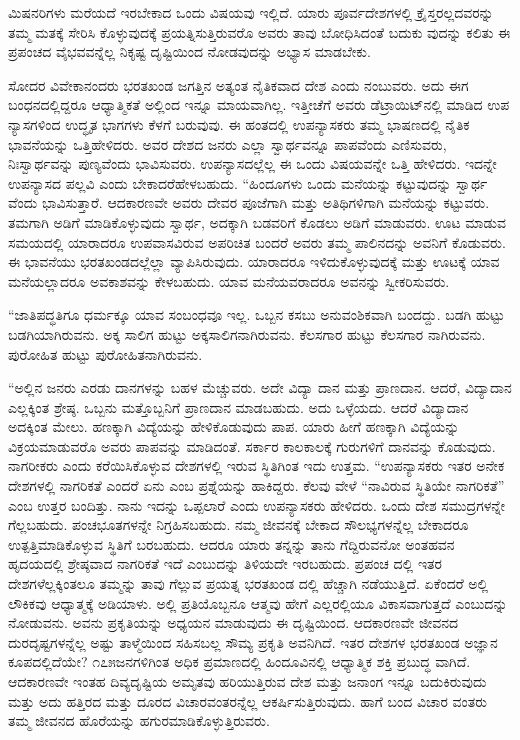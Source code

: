 ಮಿಷನರಿಗಳು ಮರೆಯದೆ ಇರಬೇಕಾದ ಒಂದು ವಿಷಯವು ಇಲ್ಲಿದೆ. ಯಾರು ಪೂರ್ವದೇಶಗಳಲ್ಲಿ ಕ್ರೈಸ್ತರಲ್ಲದವರನ್ನು ತಮ್ಮ ಮತಕ್ಕೆ ಸೇರಿಸಿ ಕೊಳ್ಳುವುದಕ್ಕೆ ಪ್ರಯತ್ನಿಸುತ್ತಿರುವರೊ ಅವರು ತಾವು ಬೋಧಿಸಿದಂತೆ ಬದುಕು ವುದನ್ನು ಕಲಿತು ಈ ಪ್ರಪಂಚದ ವೈಭವವನ್ನೆಲ್ಲ ನಿಕೃಷ್ಟ ದೃಷ್ಟಿಯಿಂದ ನೋಡವುದನ್ನು ಅಭ್ಯಾಸ ಮಾಡಬೇಕು.

ಸೋದರ ವಿವೇಕಾನಂದರು ಭರತಖಂಡ ಜಗತ್ತಿನ ಅತ್ಯಂತ ನೈತಿಕವಾದ ದೇಶ ಎಂದು ನಂಬುವರು. ಅದು ಈಗ ಬಂಧನದಲ್ಲಿದ್ದರೂ ಆಧ್ಯಾತ್ಮಿಕತೆ ಅಲ್ಲಿಂದ ಇನ್ನೂ ಮಾಯವಾಗಿಲ್ಲ. ಇತ್ತೀಚೆಗೆ ಅವರು ಡೆಟ್ರಾಯಿಟ್​ನಲ್ಲಿ ಮಾಡಿದ ಉಪ ನ್ಯಾಸಗಳಿಂದ ಉದ್ಧೃತ ಭಾಗಗಳು ಕೆಳಗೆ ಬರುವುವು. ಈ ಹಂತದಲ್ಲಿ ಉಪನ್ಯಾಸಕರು ತಮ್ಮ ಭಾಷಣದಲ್ಲಿ ನೈತಿಕ ಭಾವನೆಯನ್ನು ಒತ್ತಿಹೇಳಿದರು. ಅವರ ದೇಶದ ಜನರು ಎಲ್ಲಾ ಸ್ವಾರ್ಥವನ್ನೂ ಪಾಪವೆಂದು ಎಣಿಸುವರು, ನಿಃಸ್ವಾರ್ಥವನ್ನು ಪುಣ್ಯವೆಂದು ಭಾವಿಸುವರು. ಉಪನ್ಯಾಸದಲ್ಲೆಲ್ಲ ಈ ಒಂದು ವಿಷಯವನ್ನೇ ಒತ್ತಿ ಹೇಳಿದರು. ಇದನ್ನೇ ಉಪನ್ಯಾಸದ ಪಲ್ಲವಿ ಎಂದು ಬೇಕಾದರೆಹೇಳಬಹುದು. “ಹಿಂದೂಗಳು ಒಂದು ಮನೆಯನ್ನು ಕಟ್ಟುವುದನ್ನು ಸ್ವಾರ್ಥ ವೆಂದು ಭಾವಿಸುತ್ತಾರೆ. ಆದಕಾರಣವೇ ಅವರು ದೇವರ ಪೂಜೆಗಾಗಿ ಮತ್ತು ಅತಿಥಿಗಳಿಗಾಗಿ ಮನೆಯನ್ನು ಕಟ್ಟುವರು. ತಮಗಾಗಿ ಅಡಿಗೆ ಮಾಡಿಕೊಳ್ಳುವುದು ಸ್ವಾರ್ಥ, ಅದಕ್ಕಾಗಿ ಬಡವರಿಗೆ ಕೊಡಲು ಅಡಿಗೆ ಮಾಡುವರು. ಊಟ ಮಾಡುವ ಸಮಯದಲ್ಲಿ ಯಾರಾದರೂ ಉಪವಾಸವಿರುವ ಅಪರಿಚಿತ ಬಂದರೆ ಅವರು ತಮ್ಮ ಪಾಲಿನದನ್ನು ಅವನಿಗೆ ಕೊಡುವರು. ಈ ಭಾವನೆಯು ಭರತಖಂಡದಲ್ಲೆಲ್ಲಾ ವ್ಯಾಪಿಸಿರುವುದು. ಯಾರಾದರೂ ಇಳಿದುಕೊಳ್ಳುವುದಕ್ಕೆ ಮತ್ತು ಊಟಕ್ಕೆ ಯಾವ ಮನೆಯಲ್ಲಾದರೂ ಅವಕಾಶವನ್ನು ಕೇಳಬಹುದು. ಯಾವ ಮನೆಯವರಾದರೂ ಅವನನ್ನು ಸ್ವೀಕರಿಸುವರು.

“ಜಾತಿಪದ್ಧತಿಗೂ ಧರ್ಮಕ್ಕೂ ಯಾವ ಸಂಬಂಧವೂ ಇಲ್ಲ. ಒಬ್ಬನ ಕಸಬು ಅನುವಂಶಿಕವಾಗಿ ಬಂದದ್ದು. ಬಡಗಿ ಹುಟ್ಟು ಬಡಗಿಯಾಗಿರುವನು. ಅಕ್ಕ ಸಾಲಿಗ ಹುಟ್ಟು ಅಕ್ಕಸಾಲಿಗನಾಗಿರುವನು. ಕೆಲಸಗಾರ ಹುಟ್ಟು ಕೆಲಸಗಾರ ನಾಗಿರುವನು. ಪುರೋಹಿತ ಹುಟ್ಟು ಪುರೋಹಿತನಾಗಿರುವನು.

“ಅಲ್ಲಿನ ಜನರು ಎರಡು ದಾನಗಳನ್ನು ಬಹಳ ಮೆಚ್ಚುವರು. ಅದೇ ವಿದ್ಯಾ ದಾನ ಮತ್ತು ಪ್ರಾಣದಾನ. ಆದರೆ, ವಿದ್ಯಾದಾನ ಎಲ್ಲಕ್ಕಿಂತ ಶ್ರೇಷ್ಠ. ಒಬ್ಬನು ಮತ್ತೊಬ್ಬನಿಗೆ ಪ್ರಾಣದಾನ ಮಾಡಬಹುದು. ಅದು ಒಳ್ಳೆಯದು. ಆದರೆ ವಿದ್ಯಾದಾನ ಅದಕ್ಕಿಂತ ಮೇಲು. ಹಣಕ್ಕಾಗಿ ವಿದ್ಯೆಯನ್ನು ಹೇಳಿಕೊಡುವುದು ಪಾಪ. ಯಾರು ಹೀಗೆ ಹಣಕ್ಕಾಗಿ ವಿದ್ಯೆಯನ್ನು ವಿಕ್ರಯಮಾಡುವರೊ ಅವರು ಪಾಪವನ್ನು ಮಾಡಿದಂತೆ. ಸರ್ಕಾರ ಕಾಲಕಾಲಕ್ಕೆ ಗುರುಗಳಿಗೆ ದಾನವನ್ನು ಕೊಡುವುದು. ನಾಗರೀಕರು ಎಂದು ಕರೆಯಿಸಿಕೊಳ್ಳುವ ದೇಶಗಳಲ್ಲಿ ಇರುವ ಸ್ಥಿತಿಗಿಂತ ಇದು ಉತ್ತಮ. “ಉಪನ್ಯಾಸಕರು ಇತರ ಅನೇಕ ದೇಶಗಳಲ್ಲಿ ನಾಗರಿಕತೆ ಎಂದರೆ ಏನು ಎಂಬ ಪ್ರಶ್ನೆಯನ್ನು ಹಾಕಿದ್ದರು. ಕೆಲವು ವೇಳೆ “ನಾವಿರುವ ಸ್ಥಿತಿಯೇ ನಾಗರಿಕತೆ” ಎಂಬ ಉತ್ತರ ಬಂದಿತ್ತು. ನಾನು ಇದನ್ನು ಒಪ್ಪಲಾರೆ ಎಂದು ಉಪನ್ಯಾಸಕರು ಹೇಳಿದರು. ಒಂದು ದೇಶ ಸಮುದ್ರಗಳನ್ನೇ ಗೆಲ್ಲಬಹುದು. ಪಂಚಭೂತಗಳನ್ನೇ ನಿಗ್ರಹಿಸಬಹುದು. ನಮ್ಮ ಜೀವನಕ್ಕೆ ಬೇಕಾದ ಸೌಲಭ್ಯಗಳನ್ನೆಲ್ಲ ಬೇಕಾದರೂ ಉತ್ಪತ್ತಿಮಾಡಿಕೊಳ್ಳುವ ಸ್ಥಿತಿಗೆ ಬರಬಹುದು. ಆದರೂ ಯಾರು ತನ್ನನ್ನು ತಾನು ಗೆದ್ದಿರುವನೋ ಅಂತಹವನ ಹೃದಯದಲ್ಲಿ ಶ್ರೇಷ್ಠವಾದ ನಾಗರಿಕತೆ ಇದೆ ಎಂಬುದನ್ನು ತಿಳಿಯದೇ ಇರಬಹುದು. ಪ್ರಪಂಚ ದಲ್ಲಿ ಇತರ ದೇಶಗಳೆಲ್ಲಕ್ಕಿಂತಲೂ ತಮ್ಮನ್ನು ತಾವು ಗೆಲ್ಲುವ ಪ್ರಯತ್ನ ಭರತಖಂಡ ದಲ್ಲಿ ಹೆಚ್ಚಾಗಿ ನಡೆಯುತ್ತಿದೆ. ಏಕೆಂದರೆ ಅಲ್ಲಿ ಲೌಕಿಕವು ಆಧ್ಯಾತ್ಮಕ್ಕೆ ಅಡಿಯಾಳು. ಅಲ್ಲಿ ಪ್ರತಿಯೊಬ್ಬನೂ ಆತ್ಮವು ಹೇಗೆ ಎಲ್ಲರಲ್ಲಿಯೂ ವಿಕಾಸವಾಗುತ್ತದೆ ಎಂಬುದನ್ನು ನೋಡುವನು. ಅವನು ಪ್ರಕೃತಿಯನ್ನು ಅಧ್ಯಯನ ಮಾಡುವುದು ಈ ದೃಷ್ಟಿಯಿಂದ. ಆದಕಾರಣವೇ ಜೀವನದ ದುರದೃಷ್ಟಗಳನ್ನೆಲ್ಲ ಅಷ್ಟು ತಾಳ್ಮೆಯಿಂದ ಸಹಿಸಬಲ್ಲ ಸೌಮ್ಯ ಪ್ರಕೃತಿ ಅವನಿಗಿದೆ. ಇತರ ದೇಶಗಳ ಭರತಖಂಡ ಅಜ್ಞಾನ ಕೂಪದಲ್ಲಿದೆಯೇ? ೧೭೫ಜನಗಳಿಗಿಂತ ಅಧಿಕ ಪ್ರಮಾಣದಲ್ಲಿ ಹಿಂದೂವಿನಲ್ಲಿ ಆಧ್ಯಾತ್ಮಿಕ ಶಕ್ತಿ ಪ್ರಬುದ್ಧ ವಾಗಿದೆ. ಆದಕಾರಣವೇ ಇಂತಹ ದಿವ್ಯದೃಷ್ಟಿಯ ಅಮೃತವು ಹರಿಯುತ್ತಿರುವ ದೇಶ ಮತ್ತು ಜನಾಂಗ ಇನ್ನೂ ಬದುಕಿರುವುದು ಮತ್ತು ಅದು ಹತ್ತಿರದ ಮತ್ತು ದೂರದ ವಿಚಾರವಂತರನ್ನೆಲ್ಲ ಆಕರ್ಷಿಸುತ್ತಿರುವುದು. ಹಾಗೆ ಬಂದ ವಿಚಾರ ವಂತರು ತಮ್ಮ ಜೀವನದ ಹೊರೆಯನ್ನು ಹಗುರಮಾಡಿಕೊಳ್ಳುತ್ತಿರುವರು.

